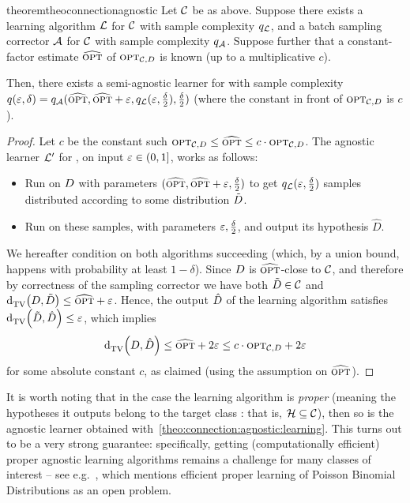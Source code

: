 \begin{restatable}{theorem}{theoconnectionagnostic}\label{theo:connection:agnostic:learning}
Let $\mathcal{C}$ be as above. Suppose there exists a learning algorithm $\mathcal{L}$ for $\mathcal{C}$ with sample complexity $q_\mathcal{L}$, and a batch sampling corrector $\mathcal{A}$ for $\mathcal{C}$ with sample complexity $q_\mathcal{A}$. Suppose further that a constant-factor estimate $\widehat{{\textsc{opt}}}$ of ${\textsc{opt}}_{\mathcal{C}, D}$ is known (up to a multiplicative $c$).

Then, there exists a {semi-}agnostic learner for \class with sample complexity $q(\varepsilon,\delta)=q_\mathcal{A}(\widehat{{\textsc{opt}}},\widehat{{\textsc{opt}}}+\varepsilon, q_\mathcal{L}(\varepsilon,\frac{\delta}{2}),\frac{\delta}{2})$ (where the constant in front of ${\textsc{opt}}_{\mathcal{C}, D}$ is $c$).
\end{restatable}
\begin{proof}
Let $c$ be the constant such ${\textsc{opt}}_{\mathcal{C},D} \leq \widehat{{\textsc{opt}}}\leq c\cdot{\textsc{opt}}_{\mathcal{C},D}$. The agnostic learner $\mathcal{L}^\prime$ for \property, on input $\varepsilon\in(0,1]$, works as follows:
\begin{itemize}[-]
  \item\label{theo:connection:agnostic:learning:step:1} Run \Algo on $D$ with parameters $(\widehat{{\textsc{opt}}}, \widehat{{\textsc{opt}}}+\varepsilon,\frac{\delta}{2})$ to get $q_\mathcal{L}(\varepsilon,\frac{\delta}{2})$ samples distributed according to some distribution $\tilde{D}$.
  \item Run \Learner on these samples, with parameters $\varepsilon,\frac{\delta}{2}$, and output its hypothesis $\hat{D}$.
\end{itemize}
We hereafter condition on both algorithms succeeding (which, by a union bound, happens with probability at least $1-\delta$). Since $D$  is $\widehat{{\textsc{opt}}}$-close to $\mathcal{C}$, and therefore by correctness of the sampling corrector we have both $\tilde{D}\in\mathcal{C}$ and ${\operatorname{d}_{\textrm{TV}}^{}\!\left({D, \tilde{D}}\right)} \leq \widehat{{\textsc{opt}}}+\varepsilon$. Hence, the output $\hat{D}$ of the learning algorithm satisfies ${\operatorname{d}_{\textrm{TV}}^{}\!\left({\tilde{D}, \hat{D}}\right)} \leq \varepsilon$, which implies
\begin{equation}
	{\operatorname{d}_{\textrm{TV}}^{}\!\left({\ensuremath{D}, \hat{\ensuremath{D}}}\right)} \leq \widehat{{\textsc{opt}}} + 2\varepsilon \leq c\cdot{\textsc{opt}}_{\mathcal{C},D} + 2\varepsilon \label{eq:connection:agnostic:learning}
\end{equation}
for some absolute constant $c$, as claimed (using the assumption on $\widehat{{\textsc{opt}}}$).
\end{proof}

It is worth noting that in the case the learning algorithm is \emph{proper} (meaning the hypotheses it outputs belong to the target class \class: that is, $\mathcal{H}\subseteq\mathcal{C}$), then so is the agnostic learner obtained with~\cref{theo:connection:agnostic:learning}. This turns out to be a very strong guarantee: specifically, getting (computationally efficient) proper agnostic learning algorithms remains a challenge for many classes of interest -- see e.g.~\cite{DDS:PBD:12}, which mentions efficient proper learning of Poisson Binomial Distributions as an open problem.

